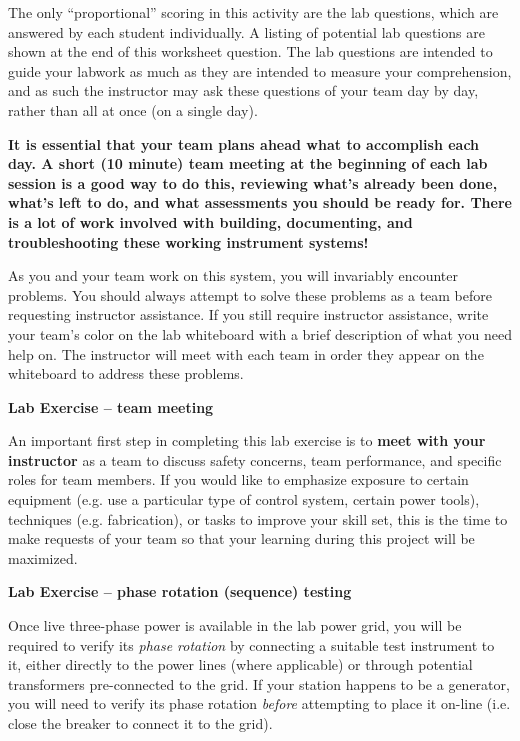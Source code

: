 The only ``proportional'' scoring in this activity are the lab questions, which are answered by each student individually.  A listing of potential lab questions are shown at the end of this worksheet question.  The lab questions are intended to guide your labwork as much as they are intended to measure your comprehension, and as such the instructor may ask these questions of your team day by day, rather than all at once (on a single day).

{\bf It is essential that your team plans ahead what to accomplish each day.  A short (10 minute) team meeting at the beginning of each lab session is a good way to do this, reviewing what's already been done, what's left to do, and what assessments you should be ready for.  There is a lot of work involved with building, documenting, and troubleshooting these working instrument systems!}

As you and your team work on this system, you will invariably encounter problems.  You should always attempt to solve these problems as a team before requesting instructor assistance.  If you still require instructor assistance, write your team's color on the lab whiteboard with a brief description of what you need help on.  The instructor will meet with each team in order they appear on the whiteboard to address these problems.





\vfil \eject

\noindent
{\bf Lab Exercise -- team meeting}

\vskip 5pt

An important first step in completing this lab exercise is to {\bf meet with your instructor} as a team to discuss safety concerns, team performance, and specific roles for team members.  If you would like to emphasize exposure to certain equipment (e.g. use a particular type of control system, certain power tools), techniques (e.g. fabrication), or tasks to improve your skill set, this is the time to make requests of your team so that your learning during this project will be maximized.

\vskip 20pt






\noindent
{\bf Lab Exercise -- phase rotation (sequence) testing}

\vskip 5pt

Once live three-phase power is available in the lab power grid, you will be required to verify its {\it phase rotation} by connecting a suitable test instrument to it, either directly to the power lines (where applicable) or through potential transformers pre-connected to the grid.  If your station happens to be a generator, you will need to verify its phase rotation {\it before} attempting to place it on-line (i.e. close the breaker to connect it to the grid).

